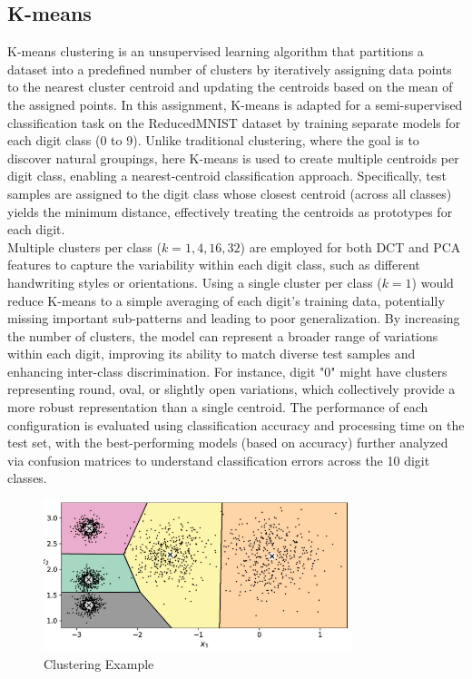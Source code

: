\documentclass[12pt]{article}
\begin{document}
\subsection{K-means}

K-means clustering is an unsupervised learning algorithm that partitions a dataset into a predefined number of clusters by iteratively assigning data points to the nearest cluster centroid and updating the centroids based on the mean of the assigned points. In this assignment, K-means is adapted for a semi-supervised classification task on the ReducedMNIST dataset by training separate models for each digit class (0 to 9). Unlike traditional clustering, where the goal is to discover natural groupings, here K-means is used to create multiple centroids per digit class, enabling a nearest-centroid classification approach. Specifically, test samples are assigned to the digit class whose closest centroid (across all classes) yields the minimum distance, effectively treating the centroids as prototypes for each digit.\\
Multiple clusters per class (\( k = 1, 4, 16, 32 \)) are employed for both DCT and PCA features to capture the variability within each digit class, such as different handwriting styles or orientations. Using a single cluster per class (\( k = 1 \)) would reduce K-means to a simple averaging of each digit's training data, potentially missing important sub-patterns and leading to poor generalization. By increasing the number of clusters, the model can represent a broader range of variations within each digit, improving its ability to match diverse test samples and enhancing inter-class discrimination. For instance, digit "0" might have clusters representing round, oval, or slightly open variations, which collectively provide a more robust representation than a single centroid. The performance of each configuration is evaluated using classification accuracy and processing time on the test set, with the best-performing models (based on accuracy) further analyzed via confusion matrices to understand classification errors across the 10 digit classes.

\begin{figure}[H]
    \centering
    \includegraphics[width=0.8\textwidth]{Kmeans example.png}
    \caption{Clustering Example}
    \label{fig:kmeans_clusters}
\end{figure}
\end{document}
